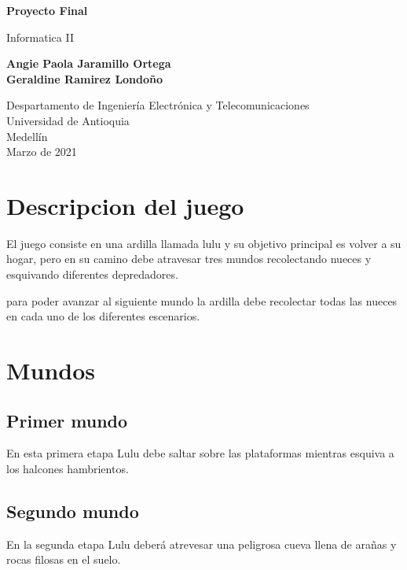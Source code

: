 \documentclass{article}
\begin{document}
\begin{titlepage}
    \begin{center}
        \vspace*{1cm}
            
        \Huge
        \textbf{Proyecto Final}
            
        \vspace{0.5cm}
        \LARGE
        Informatica II
            
        \vspace{1.5cm}
            
        \textbf{Angie Paola Jaramillo Ortega}\\
        \textbf{Geraldine Ramirez Londoño}
            
        \vfill
            
        \vspace{0.8cm}
            
        \Large
        Despartamento de Ingeniería Electrónica y Telecomunicaciones\\
        Universidad de Antioquia\\
        Medellín\\
        Marzo de 2021
            
    \end{center}
\end{titlepage}


\newpage
\section{Descripcion del juego}
El juego consiste en una ardilla llamada lulu y su objetivo principal es volver a su hogar, pero en su camino debe atravesar tres mundos recolectando nueces y esquivando diferentes depredadores.

para poder avanzar al siguiente mundo la ardilla debe recolectar todas las nueces en cada uno de los diferentes escenarios. 

\section{Mundos}
\subsection{Primer mundo}
En esta primera etapa Lulu debe saltar sobre las plataformas mientras esquiva a los halcones hambrientos.

\subsection{Segundo mundo}
En la segunda etapa Lulu deberá atrevesar una peligrosa cueva llena de arañas y rocas filosas en el suelo.
\end{document}
